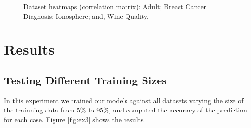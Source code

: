 \documentclass[conference]{IEEEtran}
\begin{document}
\begin{figure}
\hspace{8pt}%
%
\caption[Dataset heatmaps (correlation matrix).]{Dataset heatmaps (correlation matrix):
 Adult;
 Breast Cancer Diagnosis;
 Ionosphere; and,
 Wine Quality.}%
\end{figure}

\section{Results}
\label{section:results}

\subsection{Testing Different Training Sizes}

In this experiment we trained our models against all datasets varying the size of the trainning data from 5\% to 95\%, and computed the accuracy of the prediction for each case. Figure \ref{fig:ex3} shows the results.
\end{document}
